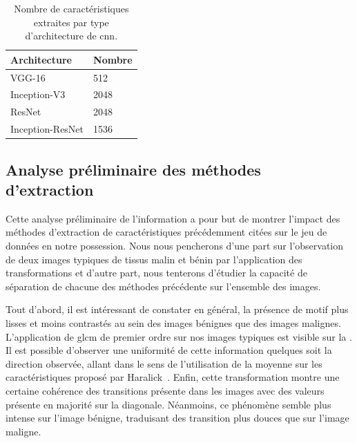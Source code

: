 \begin{table}[H]
    \centering
    \begin{tabular*}{0.6\linewidth}{l@{\extracolsep{\fill}}l}
    \toprule
    \textbf{Architecture}        & \textbf{Nombre}          \\ \hline
    VGG-16                       & 512                      \\ \hline
    Inception-V3                 & 2048                     \\ \hline
    ResNet                       & 2048                     \\ \hline 
    Inception-ResNet             & 1536                     \\
    \bottomrule
    \end{tabular*}
    \caption{Nombre de caractéristiques extraites par type d'architecture de \gls{cnn}.}
    \label{tab:number_features_transferlearning}
\end{table}\par

\clearpage

\subsection{Analyse préliminaire des méthodes d'extraction}
Cette analyse préliminaire de l'information a pour but de montrer l'impact des méthodes d'extraction de caractéristiques précédemment citées sur le jeu de données en notre possession. Nous nous pencherons d'une part sur l'observation de deux images typiques de tissus malin et bénin par l'application des transformations et d'autre part, nous tenterons d'étudier la capacité de séparation de chacune des méthodes précédente sur l'ensemble des images.\par

Tout d'abord, il est intéressant de constater en général, la présence de motif plus lisses et moins contrastés au sein des images bénignes que des images malignes. L'application de \gls{glcm} de premier ordre sur nos images typiques est visible sur la . Il est possible d'observer une uniformité de cette information quelques soit la direction observée, allant dans le sens de l'utilisation de la moyenne sur les caractéristiques proposé par Haralick~\cite{Wiltgen2008}. Enfin, cette transformation montre une certaine cohérence des transitions présente dans les images avec des valeurs présente en majorité sur la diagonale. Néanmoins, ce phénomène semble plus intense sur l'image bénigne, traduisant des transition plus douces que sur l'image maligne.\par

